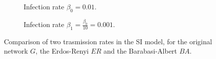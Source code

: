 \begin{figure}[htbp]
  \centering
  \begin{subfigure}{0.45\textwidth}
            \caption{Infection rate $\beta_0= 0.01$.}
            \label{fig:diff_si_1}
        \end{subfigure}
        \begin{subfigure}{0.45\textwidth}
            \caption{Infection rate $\beta_1= \frac{\beta_0}{10} =  0.001$. }
            \label{fig:diff_si_2}
          \end{subfigure}
          \caption{Comparison of two trasmission rates in the SI model, for the original network $G$, the Erdos-Renyi $ER$ and the Barabasi-Albert $BA$.}
          \label{fig:diff_si}
     \end{figure}

